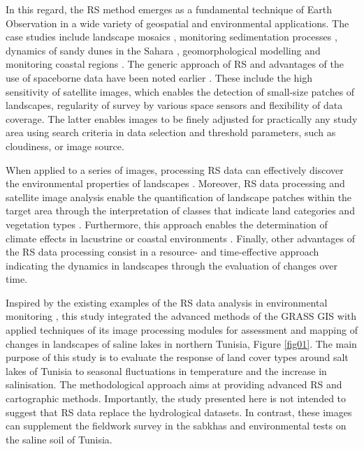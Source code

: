 \documentclass[land,article,accept,pdftex,moreauthors]{Definitions/mdpi}
\begin{document}
{In this regard, the RS method} emerges as a fundamental technique of Earth Observation in a wide variety of geospatial and environmental applications. {The case studies include }landscape mosaics \cite{BIARNES2021103281}, monitoring sedimentation processes \cite{TOWNSHEND1989177}, dynamics of sandy dunes in the Sahara \cite{Afrasinei}, geomorphological modelling \cite{Desprats} and monitoring coastal regions \cite{AMROUNI201973,Jaquet}. The generic approach of {RS and advantages of the use of spaceborne data have} been noted earlier \cite{RAMPHERI2023103359}{. These} include the {high} sensitivity of satellite images, which enables the detection of small-size patches of landscapes, regularity of survey by various space sensors and flexibility of data coverage{. The latter enables images to be} finely adjusted for practically any study area using search criteria in {data} selection and threshold parameters, {such as }cloudiness, {or} image source. 

When applied to a series of images, processing RS data can effectively discover the environmental properties of  landscapes \cite{Toujani,Quarmby,Gelebo}. Moreover, RS data processing and satellite image analysis {enable }the quantification of {landscape} patches within the target {area} through the interpretation of classes {that indicate} land categories and vegetation types \cite{Benedetti,Godinho}. {Furthermore, this approach enables the} determination of climate effects in lacustrine or coastal environments \cite{Souissi}. Finally, other advantages of the RS data processing {consist in} a resource- and time-effective {approach} indicating {the }dynamics in landscapes through the evaluation of changes {over} time{.} 

Inspired by the existing examples of the RS data analysis in environmental monitoring \cite{f9020059,Lemenkova202229,Fathalli,Abbas,Henchiri}, this study integrated the advanced methods of the GRASS GIS with applied techniques of its image processing modules for assessment and mapping of changes in landscapes of saline lakes in northern Tunisia, Figure \ref{fig01}. {The main purpose of this study is to evaluate} the response {of land cover types around salt lakes of Tunisia }to seasonal fluctuations in temperature {and} the {increase} in salinisation. The {methodological approach aims at providing} advanced RS and cartographic methods. Importantly, the study presented here is not intended to suggest that RS data replace the hydrological datasets. In contrast, these images can supplement the fieldwork survey in the sabkhas and environmental tests on the saline soil of Tunisia. 
\end{document}
